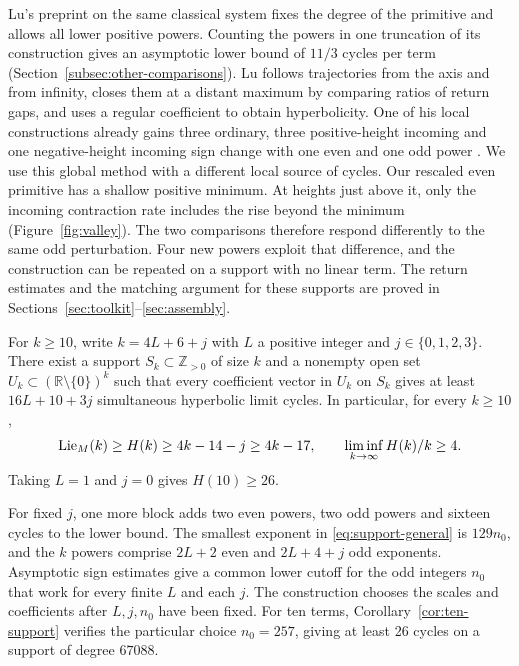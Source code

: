 Lu's preprint on the same classical system \cite{LuDegree} fixes the
degree of the primitive and allows all lower positive powers. Counting
the powers in one truncation of its construction gives an asymptotic
lower bound of $11/3$ cycles per term
(Section~\ref{subsec:other-comparisons}). Lu follows trajectories from
the axis and from infinity, closes them at a distant maximum by comparing
ratios of return gaps, and uses a regular coefficient to obtain
hyperbolicity. One of his local constructions already gains three
ordinary, three positive-height incoming and one negative-height incoming
sign change with one even and one odd power \cite[Proposition~4.3]{LuDegree}.
We use this global method with a different local source of cycles.
Our rescaled even primitive has a shallow positive minimum. At heights
just above it, only the incoming contraction rate includes the rise
beyond the minimum (Figure~\ref{fig:valley}). The two comparisons
therefore respond differently to the same odd perturbation. Four new
powers exploit that difference, and the construction can be repeated on
a support with no linear term. The return estimates and the matching
argument for these supports are proved in Sections~\ref{sec:toolkit}--\ref{sec:assembly}.

\hypertarget{main.theorem}{}
\begin{theorem}\label{thm:main}
For $k\ge10$, write $k=4L+6+j$ with $L$ a positive integer and $j\in\{0,1,2,3\}$.
There exist a support $S_k\subset\mathbb Z_{>0}$ of size $k$ and a
nonempty open set $U_k\subset(\mathbb R\setminus\{0\})^k$ such that
every coefficient vector in $U_k$ on $S_k$ gives at least
$16L+10+3j$ simultaneous hyperbolic limit cycles. In particular, for every $k\ge10$,
\begin{equation}\label{eq:main-bound}
 \operatorname{Lie}_{M}(k)\ge H(k)\ge 4k-14-j\ge 4k-17,
 \qquad \liminf_{k\to\infty} H(k)/k\ge4 .
\end{equation}
Taking $L=1$ and $j=0$ gives $H(10)\ge26$.
\end{theorem}

For fixed $j$, one more block adds two even powers, two odd powers and
sixteen cycles to the lower bound. The smallest exponent in
\eqref{eq:support-general} is $129n_0$, and the $k$ powers comprise
$2L+2$ even and $2L+4+j$ odd exponents. Asymptotic sign estimates
give a common lower cutoff for the odd integers $n_0$ that work for
every finite $L$ and each $j$. The construction chooses the scales
and coefficients after $L,j,n_0$ have been fixed. For ten terms,
Corollary~\ref{cor:ten-support} verifies the particular choice
$n_0=257$, giving at least 26 cycles on a support of degree $67088$.

